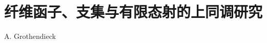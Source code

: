 \setcounter{chapter}{7}
\chapter{纤维函子、支集与有限态射的上同调研究}
\begin{center}
A. Grothendieck
\end{center}
\label{sga4.exp.VIII}


